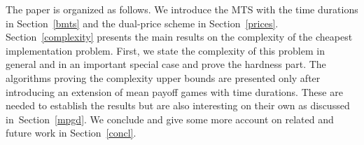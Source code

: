 The paper is organized as follows. We introduce the MTS with the 
time durations in Section~\ref{bmts} and 
the dual-price scheme 
in Section~\ref{prices}. Section~\ref{complexity} presents the main results on the complexity of the cheapest implementation problem. 
First, we state the complexity of this problem in general and in an important special case and prove the hardness part. The algorithms proving the complexity upper bounds are presented only after introducing an extension of {mean payoff games with time durations}. These are needed to establish the results but are also interesting on their own as discussed in~Section~\ref{mpgd}.
 We conclude and give some more account on related and future 
 work in Section~\ref{concl}.


